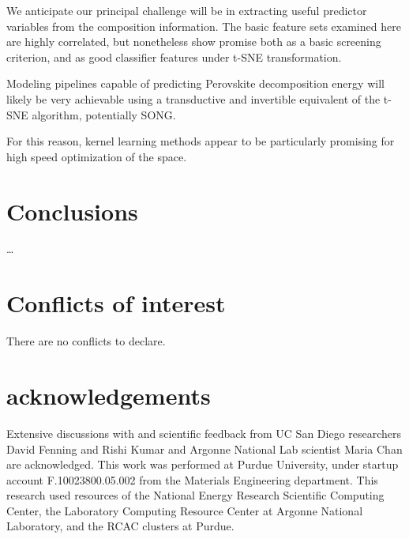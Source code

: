\documentclass[twoside, twocolumn, 9pt, draft]{article}
\begin{document}
We anticipate our principal challenge will be in extracting useful
predictor variables from the composition information. The basic
feature sets examined here are highly correlated, but nonetheless show
promise both as a basic screening criterion, and as good classifier
features under t-SNE transformation.

Modeling pipelines capable of predicting Perovskite decomposition
energy will likely be very achievable using a transductive and
invertible equivalent of the t-SNE algorithm, potentially SONG.

For this reason, kernel learning methods appear to be particularly
promising for high speed optimization of the space.

\section*{Conclusions}
\label{sec:org865278d}
\ldots{}\\

\section*{Conflicts of interest}
\label{sec:orgea0e21a}
There are no conflicts to declare.

\section*{acknowledgements}
\label{sec:org82d0862}
Extensive discussions with and scientific feedback from UC San Diego
researchers David Fenning and Rishi Kumar and Argonne National Lab
scientist Maria Chan are acknowledged. This work was performed at Purdue
University, under startup account F.10023800.05.002 from the Materials
Engineering department. This research used resources of the National
Energy Research Scientific Computing Center, the Laboratory Computing
Resource Center at Argonne National Laboratory, and the RCAC clusters at
Purdue.



\end{document}
